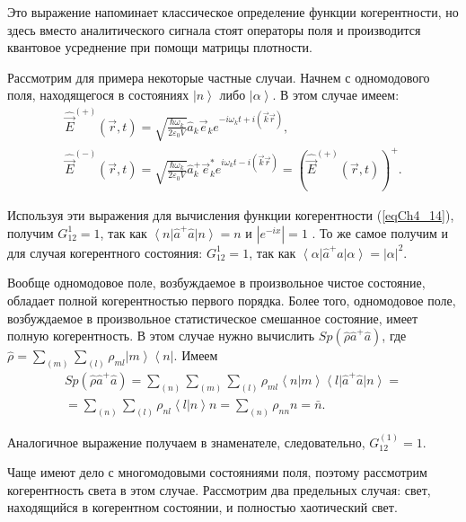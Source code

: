 Это выражение напоминает классическое определение функции
когерентности, но здесь вместо аналитического сигнала стоят операторы
поля и производится квантовое усреднение при помощи матрицы
плотности. 

Рассмотрим для примера некоторые частные случаи. Начнем с одномодового
поля, находящегося в состояниях  $\left|n\right>$  либо  $\left|\alpha\right>$.  В этом случае имеем: 
\begin{eqnarray}
\hat{\vec{E}}^{(+)}\left(\vec{r}, t\right) = \sqrt{\frac{\hbar \omega_k}{2 \varepsilon_0
    V}} \hat{a}_k \vec{e}_k e^{-i \omega_k t + i \left(\vec{k}\vec{r}
  \right)},
\nonumber \\
\hat{\vec{E}}^{(-)}\left(\vec{r}, t\right) = \sqrt{\frac{\hbar \omega_k}{2 \varepsilon_0
V}} \hat{a}_k^{+} \vec{e}_k^{*} e^{i \omega_k t - i \left(\vec{k}\vec{r}
  \right)} = \left(\hat{\vec{E}}^{(+)}\left(\vec{r}, t\right)\right)^{+}.
\label{eqCh4_15}
\end{eqnarray}

Используя эти выражения для вычисления функции когерентности
(\ref{eqCh4_14}), получим $G_{12}^{1} = 1$,  так как
$\left<n\right|\hat{a}^{+}\hat{a}\left|n\right> = n$   и
$\left|e^{-i x}\right| = 1$ . То же самое получим и для случая
когерентного состояния:  $G_{12}^{1} = 1$,  так как
$\left<\alpha\right|\hat{a}^{+}\hat{a}\left|\alpha\right> =
\left|\alpha\right|^2$. 

Вообще одномодовое поле, возбуждаемое в произвольное чистое состояние,
обладает полной когерентностью первого порядка. Более того,
одномодовое поле, возбуждаемое в произвольное статистическое смешанное
состояние, имеет полную когерентность. В этом случае нужно вычислить
$Sp \left(\hat{\rho} \hat{a}^{+}\hat{a}\right)$,  где  $\hat{\rho} =
\sum_{(m)}\sum_{(l)}\rho_{ml}\left|m\right>\left<n\right|$.  Имеем  
\begin{eqnarray}
Sp \left(\hat{\rho} \hat{a}^{+}\hat{a}\right) = 
\sum_{(n)}\sum_{(m)}\sum_{(l)}\rho_{ml}\left<n\right.\left|m\right>\left<l\right|
\hat{a}^{+}\hat{a}\left|n\right> = 
\nonumber \\
= \sum_{(n)}\sum_{(l)}\rho_{nl}\left<l\right.\left|n\right>n = 
\sum_{(n)}\rho_{nn}n = \bar{n}.
\label{eqCh4_16}
\end{eqnarray}

Аналогичное выражение получаем в знаменателе, следовательно,
$G_{12}^{(1)} = 1$.

Чаще имеют дело с многомодовыми состояниями поля, поэтому рассмотрим
когерентность света в этом случае. Рассмотрим два предельных случая:
свет, находящийся в когерентном состоянии, и полностью хаотический
свет. 

